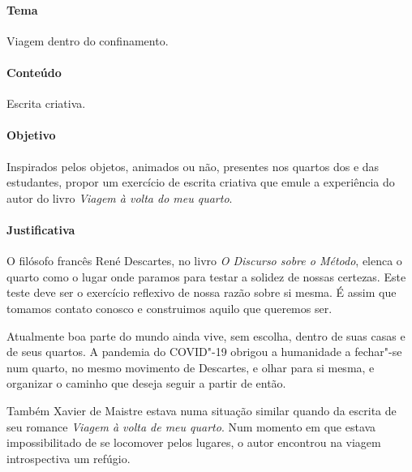 \documentclass[12pt]{extarticle}
\begin{document}
\paragraph{Tema} Viagem dentro do confinamento. 

\paragraph{Conteúdo} Escrita criativa. 

\paragraph{Objetivo} Inspirados pelos objetos, animados ou não, 
presentes nos quartos dos e das estudantes, propor um exercício 
de escrita criativa que emule a experiência do autor do livro
\textit{Viagem à volta do meu quarto}.

\paragraph{Justificativa}
O filósofo francês René Descartes, no livro \textit{O Discurso sobre o Método}, 
elenca o quarto como o lugar onde paramos para testar a solidez de nossas certezas. 
Este teste deve ser o exercício reflexivo de nossa razão sobre si mesma. É assim
que tomamos contato conosco e construimos aquilo que queremos ser. 

Atualmente boa parte do mundo ainda vive, sem escolha, dentro de suas
casas e de seus quartos. A pandemia do COVID"-19 obrigou a humanidade
a fechar"-se num quarto, no mesmo movimento de Descartes, e olhar para  
si mesma, e organizar o caminho que deseja seguir a partir de então. 

Também Xavier de Maistre estava numa situação similar quando da 
escrita de seu romance \textit{Viagem à volta de meu quarto}. 
Num momento em que estava impossibilitado de se locomover pelos
lugares, o autor encontrou na viagem introspectiva um refúgio. 
\end{document}
